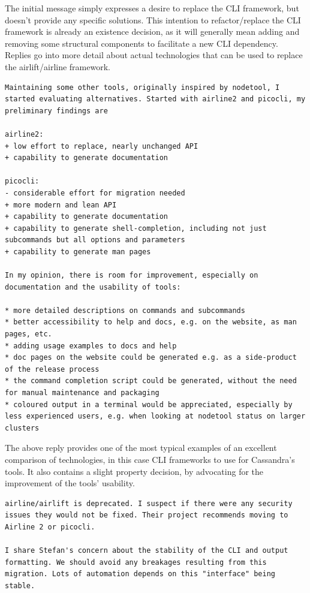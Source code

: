 \documentclass[a4paper, 12pt]{article}
\begin{document}
			The initial message simply expresses a desire to replace the CLI framework, but doesn't provide any specific solutions. This intention to refactor/replace the CLI framework is already an existence decision, as it will generally mean adding and removing some structural components to facilitate a new CLI dependency. Replies go into more detail about actual technologies that can be used to replace the airlift/airline framework.
		
			\begin{verbatim}
Maintaining some other tools, originally inspired by nodetool, I started evaluating alternatives. Started with airline2 and picocli, my preliminary findings are

airline2:
+ low effort to replace, nearly unchanged API
+ capability to generate documentation

picocli:
- considerable effort for migration needed
+ more modern and lean API
+ capability to generate documentation
+ capability to generate shell-completion, including not just subcommands but all options and parameters
+ capability to generate man pages

In my opinion, there is room for improvement, especially on documentation and the usability of tools:

* more detailed descriptions on commands and subcommands
* better accessibility to help and docs, e.g. on the website, as man pages, etc.
* adding usage examples to docs and help
* doc pages on the website could be generated e.g. as a side-product of the release process
* the command completion script could be generated, without the need for manual maintenance and packaging
* coloured output in a terminal would be appreciated, especially by less experienced users, e.g. when looking at nodetool status on larger clusters
			\end{verbatim}
			
			The above reply provides one of the most typical examples of an excellent comparison of technologies, in this case CLI frameworks to use for Cassandra's tools. It also contains a slight property decision, by advocating for the improvement of the tools' usability.
		
			\begin{verbatim}
airline/airlift is deprecated. I suspect if there were any security issues they would not be fixed. Their project recommends moving to Airline 2 or picocli.

I share Stefan's concern about the stability of the CLI and output formatting. We should avoid any breakages resulting from this migration. Lots of automation depends on this "interface" being stable.
			\end{verbatim}
		
\end{document}
